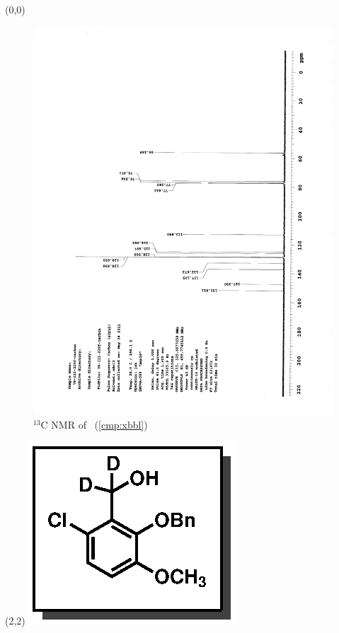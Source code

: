 \clearpage
\begin{textblock}{20}(0,0)
\begin{figure}[htb]
\caption{$^{13}$C NMR of  \CMPxbbl\ (\ref{cmp:xbbl})}
\includegraphics[scale=0.75, trim = 0mm 0mm 0mm 5mm,
clip]{chp_singlecarbon/images/nmr/xbblC}
\vspace{-100pt}
\end{figure}
\end{textblock}
\begin{textblock}{1}(2,2)
\includegraphics[scale=0.8, angle=90]{chp_singlecarbon/images/xbbl}
\end{textblock}
\clearpage

